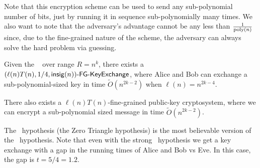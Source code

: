 Note that this encryption scheme can be used to send any sub-polynomial number of bits, just by running it in sequence sub-polynomially many times. %
 We also want to note that the adversary's advantage cannot be any less than $\frac{1}{ {\rm poly}(n)}$ since, due to the fine-grained nature of the scheme, the adversary can always solve the hard problem via guessing.


\begin{corollary}
	Given the \strongzkc~ over range $R = n^k$, there exists a $(\ell(n)T(n), 1/4, \mathsf{insig}(n))\textsf{-FG-KeyExchange}$, where Alice and Bob can exchange a sub-polynomial-sized key in time $\tilde{O}\left(n^{2k-2}\right)$ when $\ell(n)= n^{2k-4}$.
	
	There also exists a $\ell(n)T(n)$-fine-grained public-key cryptosystem, where we can encrypt a sub-polynomial sized message in time $\tilde{O}\left(n^{2k-2}\right)$. %
	
	\label{cor:kcliqueKeyExchange}
\end{corollary}

The \zThclique~hypothesis (the Zero Triangle hypothesis) is the most believable version of the \zkclique~hypothesis.
Note that even with the strong \zThclique~hypothesis we get a key exchange with a gap in the running times of Alice and Bob vs Eve. In this case, the gap is $t = 5/4 = 1.2$.



%


